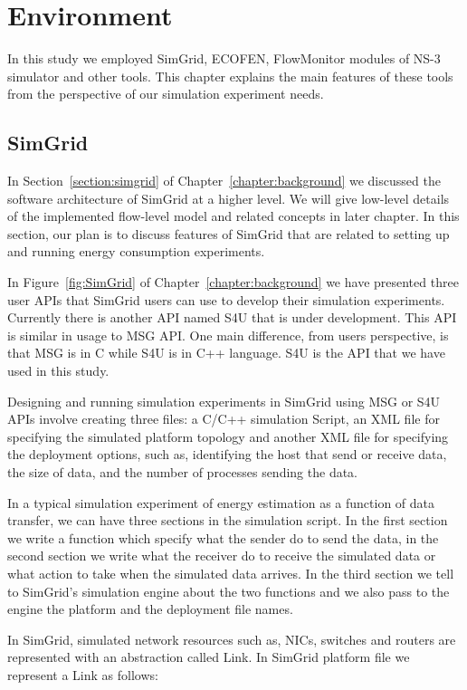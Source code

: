 \chapter{Environment}
\label{chapter:environment}
In this study we employed SimGrid, ECOFEN, FlowMonitor modules of NS-3 simulator and other tools. This chapter explains the main features of these tools from the perspective of our simulation experiment needs.

\section{SimGrid}
\label{section:simgridenvironment}
In Section~\ref{section:simgrid} of Chapter~\ref{chapter:background} we discussed the software architecture of SimGrid at a higher level. We will give low-level details of the implemented flow-level model and related concepts in later chapter. In this section, our plan is to discuss features of SimGrid that are related to setting up and running energy consumption experiments.

In Figure~\ref{fig:SimGrid} of Chapter~\ref{chapter:background} we have presented three user APIs that SimGrid users can use to develop their simulation experiments. Currently there is another API named S4U that is under development. This API is similar in usage to MSG API. One main difference, from users perspective, is that MSG is in C while S4U is in C++ language. S4U is the API that we have used in this study.  
  
Designing and running simulation experiments in SimGrid using MSG or S4U APIs involve creating three files: a C/C++ simulation Script, an XML file for specifying the simulated platform topology and another XML file for specifying the deployment options, such as, identifying the host that send or receive data, the size of data, and the number of processes sending the data. 

In a typical simulation experiment of energy estimation as a function of data transfer, we can have three sections in the simulation script. In the first section we write a function which specify what the sender do to send the data, in the second section we write what the receiver do to receive the simulated data or what action to take when the simulated data arrives. In the third section we tell to SimGrid's simulation engine about the two functions and we also pass to the engine the platform and the deployment file names. 

In SimGrid, simulated network resources such as, NICs, switches and routers are represented with an abstraction called Link. In SimGrid platform file we represent a Link as follows:


